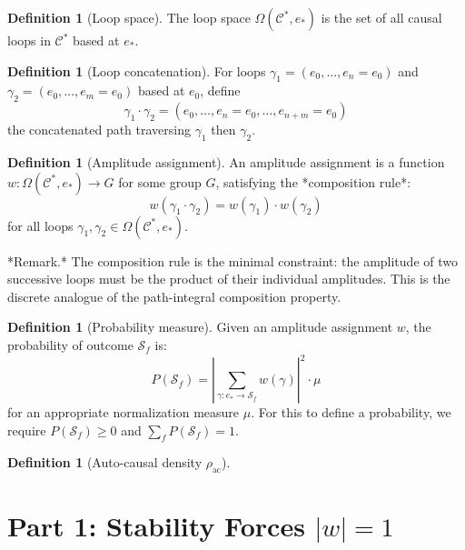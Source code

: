 \documentclass[11pt]{article}
\theoremstyle{definition}
\newtheorem{definition}[theorem]{Definition}
\theoremstyle{remark}
\begin{document}
\begin{definition}[Loop space]
\label{definition:2-6}
The loop space $\Omega(\mathcal{C}^{*}, e_{*})$ is the set of all causal loops in $\mathcal{C}^{*}$ based at $e_{*}$.

\end{definition}

\begin{definition}[Loop concatenation]
\label{definition:2-7}
For loops $\gamma_1 = (e_0, \ldots, e_n = e_0)$ and $\gamma_2 = (e_0, \ldots, e_m = e_0)$ based at $e_0$, define
$$\gamma_1 \cdot \gamma_2 = (e_0, \ldots, e_n = e_0, \ldots, e_{n+m} = e_0)$$
the concatenated path traversing $\gamma_1$ then $\gamma_2$.

\end{definition}

\begin{definition}[Amplitude assignment]
\label{definition:2-8}
An amplitude assignment is a function $w: \Omega(\mathcal{C}^{*}, e_{*}) \to G$ for some group $G$, satisfying the *composition rule*:
$$w(\gamma_1 \cdot \gamma_2) = w(\gamma_1) \cdot w(\gamma_2)$$
for all loops $\gamma_1, \gamma_2 \in \Omega(\mathcal{C}^{\ast}, e_{\ast})$.

*Remark.* The composition rule is the minimal constraint: the amplitude of two successive loops must be the product of their individual amplitudes. This is the discrete analogue of the path-integral composition property.

\end{definition}

\begin{definition}[Probability measure]
\label{definition:2-9}
Given an amplitude assignment $w$, the probability of outcome $\mathcal{S}_f$ is:
$$P(\mathcal{S}_f) = \left|\sum_{\gamma: e_{\ast} \to \mathcal{S}_f} w(\gamma)\right|^2 \cdot \mu$$
for an appropriate normalization measure $\mu$. For this to define a probability, we require $P(\mathcal{S}_f) \geq 0$ and $\sum_f P(\mathcal{S}_f) = 1$.

\end{definition}

\begin{definition}[Auto-causal density $\rho_{\mathrm{ac}}$]
\label{definition:2-10}
\end{definition}

\medskip

\section{\texorpdfstring{Part 1: Stability Forces
\(|w| = 1\)}{Part 1: Stability Forces \textbar w\textbar{} = 1}}\label{part-1-stability-forces-w-1}
\end{document}
